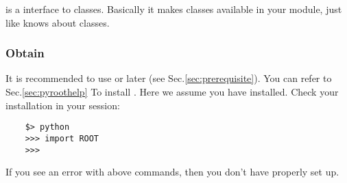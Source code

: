 \PyROOT is a \python interface to \ROOT classes. Basically it makes \ROOT classes
available in your \python module, just like \ROOT \CINT knows about \ROOT classes.

\subsubsection{Obtain \PyROOT}
It is recommended to use  or later (see Sec.\ref{sec:prerequisite}). 
You can refer to Sec.\ref{sec:pyroothelp} To install \PyROOT. Here we assume you have
\PyROOT installed. Check your installation in your \python session:
\begin{lstlisting}
    $> python
    >>> import ROOT
    >>>
\end{lstlisting}
If you see an error with above commands, then you don't have \PyROOT properly set up.

